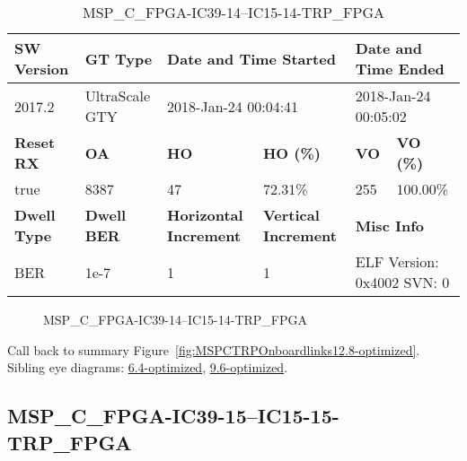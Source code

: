 \begin{table}[h]
\centering
\caption{MSP\_C\_FPGA-IC39-14--IC15-14-TRP\_FPGA}
\label{tab:MSPCFPGAIC3914IC1514TRPFPGA12.8-optimized}
\begin{tabular}{@{}|l|l|l|l|l|l|@{}}
\toprule
\textbf{SW Version}                & \textbf{GT Type}   & \multicolumn{2}{l|}{\textbf{Date and Time Started}}            & \multicolumn{2}{l|}{\textbf{Date and Time Ended}}        \\ \midrule
2017.2                       & UltraScale GTY          & \multicolumn{2}{l|}{2018-Jan-24 00:04:41}                   & \multicolumn{2}{l|}{2018-Jan-24 00:05:02}               \\ \midrule
\textbf{Reset RX}                  & \textbf{OA} & \textbf{HO}   & \textbf{HO (\%)} & \textbf{VO} & \textbf{VO (\%)} \\ \midrule
true & 8387        & 47          & 72.31\%        & 255        & 100.00\%       \\ \midrule
\textbf{Dwell Type}                & \textbf{Dwell BER} & \textbf{Horizontal Increment} & \textbf{Vertical Increment}    & \multicolumn{2}{l|}{\textbf{Misc Info}}                  \\ \midrule
BER                            & 1e-7        & 1        & 1           & \multicolumn{2}{l|}{ELF Version: 0x4002 SVN: 0}                         \\ \bottomrule
\end{tabular}
\end{table}

\begin{figure}[h]
\caption{MSP\_C\_FPGA-IC39-14--IC15-14-TRP\_FPGA} \label{fig:MSPCFPGAIC3914IC1514TRPFPGA12.8-optimized}
\end{figure}

Call back to summary Figure~\ref{fig:MSPCTRPOnboardlinks12.8-optimized}.
Sibling eye diagrams: \hyperref[sec:MSPCFPGAIC3914IC1514TRPFPGA6.4-optimized]{6.4-optimized}, \hyperref[sec:MSPCFPGAIC3914IC1514TRPFPGA9.6-optimized]{9.6-optimized}.

\clearpage
\newpage


\subsection{MSP\_C\_FPGA-IC39-15--IC15-15-TRP\_FPGA}\label{sec:MSPCFPGAIC3915IC1515TRPFPGA12.8-optimized}

